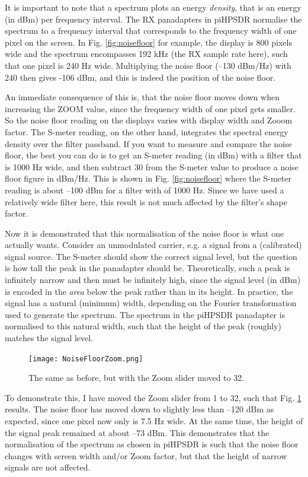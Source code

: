 \documentclass[12pt]{book}
\def\pH{pi\-HPSDR\xspace}
\begin{document}
It is important to note that a spectrum plots an energy \textit{density}, that is an energy (in dBm)
per frequency interval. The RX panadapters in \pH normalise the spectrum to a frequency interval
that corresponds to the frequency width of one pixel on the screen. In Fig. \ref{fig:noisefloor}
for example, the display is 800 pixels wide and the spectrum encompasses 192 kHz (the RX sample
rate here), such that one pixel is 240 Hz wide. Multiplying the noise floor (--130 dBm/Hz)
with 240 then gives -106 dBm, and this is indeed the position of the noise floor.

An immediate consequence of this is, that the
noise floor moves down when increasing the ZOOM value, since the frequency width of one pixel gets
smaller. So the noise floor reading on the displays varies with display width and Zooom factor.
The S-meter reading, on the other hand, integrates the spectral energy density over the filter
passband. If you want to measure and compare the noise floor, the best you can do is to get an S-meter reading (in dBm) with
a filter that is 1000 Hz wide, and then subtract 30 from the S-meter value to
produce a noise floor figure in dBm/Hz. This is shown in Fig. \ref{fig:noisefloor} where the S-meter reading
is about --100 dBm for a filter with of 1000 Hz. Since we have used a relatively wide filter here,
this result is not much affected by the filter's shape factor.

Now it is demonstrated that this normalisation of the noise floor is what one actually wants.
Consider an unmodulated carrier, e.g. a signal from a (calibrated)
signal source. The S-meter should show the correct signal level, but the question is how tall the peak
in the panadapter should be. Theoretically, such a peak is infinitely narrow and then must be infinitely high, since
the signal level (in dBm) is encoded in the \textit{area} below the peak rather than in its height.
In practice, the signal has a natural (minimum) width, depending on the
Fourier transformation used to generate the spectrum. The spectrum in the \pH panadapter is normalised
to this natural width, such that the height of the peak (roughly) matches the signal level.

\begin{figure}[ht]
\center
\texttt{[image: NoiseFloorZoom.png]}
\caption{The same as before, but with the Zoom slider moved to 32.}
\label{fig:noisefloorzoom}
\end{figure}

To demonstrate this, I have moved the Zoom slider from 1 to 32, such that Fig. \ref{fig:noisefloorzoom} results.
The noise floor has moved down to slightly less than --120 dBm as expected, since one pixel now only is 7.5 Hz wide.
At the same time, the height of the signal peak remained at about --73 dBm. This demonstrates that
the normalisation of the spectrum as chosen in \pH is such that the noise floor changes with screen width and/or
Zoom factor, but that the height of narrow signals are not affected.
\end{document}
